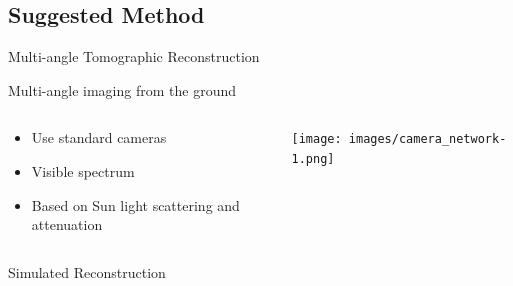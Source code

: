 \documentclass[compress,red,12pt]{beamer}
\begin{document}
\subsection{Suggested Method}

\begin{frame}{Multi-angle Tomographic Reconstruction}
  \begin{center}
    {
      \centerline{\def\svgwidth{\linewidth}\small{}}
    }
    {
      \centerline{\def\svgwidth{\linewidth}\small{}}
    }
  \end{center}
\end{frame}


\begin{frame}{Multi-angle imaging from the ground}
  \begin{columns}[T]
    \begin{column}{.5\textwidth}
      \begin{itemize}
      \item Use standard cameras
      \item Visible spectrum
      \item Based on Sun light scattering and attenuation
      \end{itemize}
    \end{column}
    \begin{column}{.5\textwidth}
      \centering
      {\texttt{[image: images/camera\_network-1.png]}}
    \end{column}
  \end{columns}
\end{frame}


\begin{frame}[label=current]{Simulated Reconstruction}
  \begin{center}
  \end{center}
\end{frame}


\begin{frame}[label=current]{}
  \centerline{
  }
\end{frame}
\end{document}
